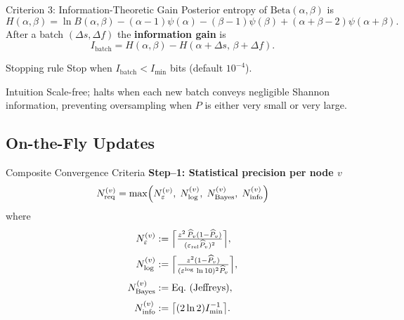 \begin{frame}{Criterion 3: Information-Theoretic Gain}
  \small
  Posterior entropy of $\text{Beta}(\alpha,\beta)$ is
  \[ H(\alpha,\beta)=\ln B(\alpha,\beta)- (\alpha-1)\psi(\alpha)- (\beta-1)\psi(\beta)+ (\alpha+\beta-2)\psi(\alpha+\beta). \]
  After a batch $(\Delta s,\Delta f)$ the \textbf{information gain} is
  \[ I_{\text{batch}} = H(\alpha,\beta) - H(\alpha+\Delta s,\,\beta+\Delta f). \]
  \begin{alertblock}{Stopping rule}
   Stop when $I_{\text{batch}}<I_{\min}$ bits (default $10^{-4}$).
  \end{alertblock}
  \begin{block}{Intuition}
 Scale-free; halts when each new batch conveys negligible Shannon information, preventing oversampling when $P$ is either very small or very large.
  \end{block}
\end{frame}

\subsection{On-the-Fly Updates}
\begin{frame}{Composite Convergence Criteria}
  \textbf{Step--1: Statistical precision per node $v$}
  \[
     N^{(v)}_{\text{req}} = \max\Bigl( N^{(v)}_{\varepsilon},\; N^{(v)}_{\log},\; N^{(v)}_{\text{Bayes}},\; N^{(v)}_{\text{info}} \Bigr)
  \]
  where
  \begin{align*}
     N^{(v)}_{\varepsilon} &:= \Bigl\lceil \tfrac{z^2\,\widehat P_v(1-\widehat P_v)}{(\varepsilon_{\text{rel}}\widehat P_v)^2}\Bigr\rceil,\\[2pt]
     N^{(v)}_{\log} &:= \Bigl\lceil \tfrac{z^2(1-\widehat P_v)}{(\varepsilon^{\log}\,\ln 10)^2\widehat P_v}\Bigr\rceil,\\[2pt]
     N^{(v)}_{\text{Bayes}} &:= \text{Eq.~(Jeffreys)} ,\\[2pt]
     N^{(v)}_{\text{info}} &:= \bigl\lceil (2\ln 2)I_{\min}^{-1}\bigr\rceil.
  \end{align*}
\end{frame}

